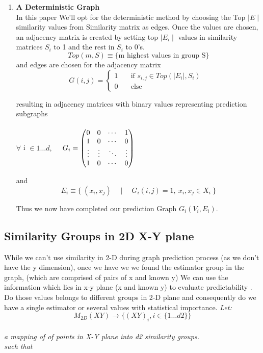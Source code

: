 \documentclass[a4paper]{article}
\begin{document}
\begin{enumerate}
\item  \textbf{A Deterministic Graph}\\
In this paper We'll opt for the deterministic method by choosing the Top $\mid E \mid$ similarity values from Similarity matrix as edges.
Once the values are chosen, an adjacency matrix is created
by setting  top $\mid E_i \mid$ values in similarity matrices $S_i$ to 1 and  the rest in $S_i$ to 0's.
\begin{equation}
Top(m,S) \equiv \{ \text{m highest values in group S} \}
\end{equation}
and edges are chosen for the adjacency matrix
 \begin{equation}     
   G(i, j)  = \begin{cases}
  1 & \quad \text{if $s_{i,j}\in Top(\mid E_i\mid,S_i)$ }\\
    0 & \quad \text{else }
\end{cases}
\label{eqn:simple_one} 
\end{equation}

resulting in adjacency matrices with binary values representing prediction subgraphs\\
\\
$\forall$  i $\in 1\dots d,\quad$
 $ G_i   =
  \begin{pmatrix}
    0  & 0 & \cdots & 1\\
    1  & 0 & \cdots & 0\\
    \vdots & \vdots & \ddots&\vdots\\
    1 & 0 &\cdots & 0\\
  \end{pmatrix}\\
$  

and 
\begin{equation}
E_i \equiv \lbrace \ (x_i,x_j) \quad \mid \quad		G_i(i,j) = 1 ,\   x_i,x_j \in X_i\  \}
\end{equation}


Thus we now have completed our prediction Graph $G_i(V_i,E_i)$.\\


\end{enumerate}

\subsection{Similarity Groups in 2D X-Y plane }
While we can't use similarity in 2-D during graph prediction process
(as we don't have the y dimension),
once we have we we found the estimator group in the graph,
(which are comprised of pairs of x and known y)
We can use the information which lies in x-y plane (x and known y)
to evaluate predictability .
Do those values belongs to different groups in 2-D plane
and consequently do we have a single estimator or several values with statistical importance.
\emph{Let:}	 \\
\begin{equation}
M_{2D}(XY)   \rightarrow {\lbrace (XY)_i, i\in \{1\dots d2\} \rbrace}
\end{equation}\\
\emph{a mapping of of points in X-Y plane into d2 similarity groups.}
\\
\emph{such that} 
\end{document}

